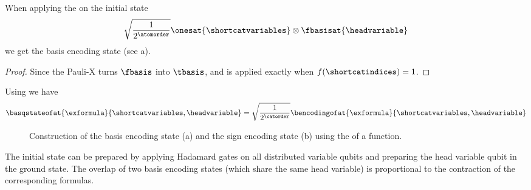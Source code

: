 \begin{lemma}
    When applying the \computationCircuit{} on the initial state
    \begin{align*}
        \sqrt{\frac{1}{2^\atomorder}}\onesat{\shortcatvariables} \otimes \fbasisat{\headvariable} %
    \end{align*}
    we get the basis encoding state (see a).
\end{lemma}
\begin{proof}
    Since the Pauli-X turns $\fbasis$ into $\tbasis$, and is applied exactly when $f(\shortcatindices)=1$.
\end{proof}


\begin{corollary}
    Using  we have
    \begin{align*}
        \basqstateofat{\exformula}{\shortcatvariables,\headvariable}
        = \sqrt{\frac{1}{2^{\catorder}}} \bencodingofat{\exformula}{\shortcatvariables,\headvariable}
    \end{align*}
\end{corollary}

\begin{figure}[t]
    \begin{center}
        
    \end{center}
    \caption{Construction of the basis encoding state (a) and the sign encoding state (b) using the \computationCircuit{} of a function.}\label{fig:basSignQstateConstruction}
\end{figure}

The initial state can be prepared by applying Hadamard gates on all distributed variable qubits and preparing the head variable qubit in the ground state.
The overlap of two basis encoding states (which share the same head variable) is proportional to the contraction of the corresponding formulas.

